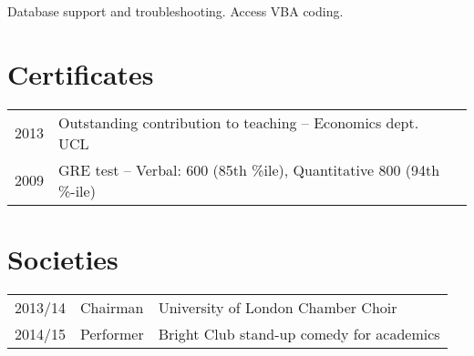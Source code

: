 \documentclass[a4paper,nomath]{deedy-resume} %
\begin{document}
\begin{minipage}[t]{0.66\textwidth}

    \begin{tightitemize}
        \item Database support and troubleshooting. Access VBA coding.
    \end{tightitemize}

    \sectionspace %

    \section{Certificates} 

    \begin{tabular}{rll}
        2013	 & Outstanding contribution to teaching -- Economics dept. UCL\\
        2009     & GRE test -- Verbal: 600 (85th \%ile), Quantitative 800 (94th \%-ile) \\
    \end{tabular}

    \sectionspace %


    \section{Societies} 

    \begin{tabular}{rll}
        2013/14 & Chairman & University of London Chamber Choir\\
        2014/15 & Performer & Bright Club stand-up comedy for academics\\
    \end{tabular}

    \sectionspace %


\end{minipage} %
\end{document}
